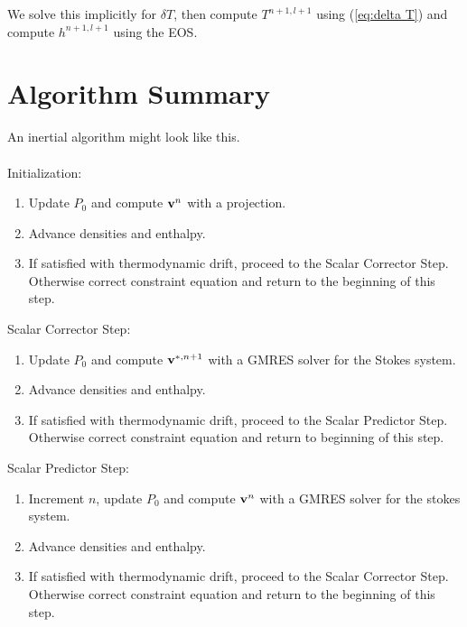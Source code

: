 \documentclass[final]{siamltex}
\def\vb {{\bf v}}
\begin{document}
We solve this implicitly for $\delta T$, then compute $T^{n+1,l+1}$
using (\ref{eq:delta T}) and compute $h^{n+1,l+1}$ using the EOS.

\section{Algorithm Summary}
An inertial algorithm might look like this.\\ \\
Initialization:\\
\begin{enumerate}
\item Update $P_0$ and compute $\vb^n$ with a projection.
\item Advance densities and enthalpy.
\item If satisfied with thermodynamic drift, proceed to the Scalar Corrector Step.
Otherwise correct constraint equation and return to the beginning of this step.\\
\end{enumerate}
Scalar Corrector Step:\\
\begin{enumerate}
\item Update $P_0$ and compute $\vb^{*,n+1}$ with a GMRES solver for the Stokes system.
\item Advance densities and enthalpy.
\item If satisfied with thermodynamic drift, proceed to the Scalar Predictor Step.
Otherwise correct constraint equation and return to beginning of this step.\\
\end{enumerate}
Scalar Predictor Step:\\
\begin{enumerate}
\item Increment $n$, update $P_0$ and compute $\vb^n$ with a GMRES solver for the stokes system.
\item Advance densities and enthalpy.
\item If satisfied with thermodynamic drift, proceed to the Scalar Corrector Step.
Otherwise correct constraint equation and return to the beginning of this step.
\end{enumerate}
\end{document}
